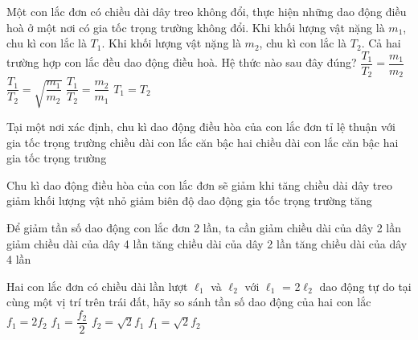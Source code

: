 \begin{ex}
Một con lắc đơn có chiều dài dây treo không đổi, thực hiện những dao động điều hoà ở một nơi có gia tốc trọng trường không đổi. Khi khối lượng vật nặng là $m_1$, chu kì con lắc là $T_1$. Khi khối lượng vật nặng là $m_2$, chu kì con lắc là $T_2$. Cả hai trường hợp con lắc đều dao động điều hoà. Hệ thức nào sau đây đúng?
\choice
{$\dfrac{T_1}{T_2}=\dfrac{m_1}{m_2}$}
{$\dfrac{T_1}{T_2}=\sqrt{\dfrac{m_1}{m_2}}$}
{$\dfrac{T_1}{T_2}=\dfrac{m_2}{m_1}$}
{\True $T_1=T_2$}
\end{ex} 
\begin{ex} %
Tại một nơi xác định, chu kì dao động điều hòa của con lắc đơn tỉ lệ thuận với
\choice
{gia tốc trọng trường}
{chiều dài con lắc}
{\True căn bậc hai chiều dài con lắc}
{căn bậc hai gia tốc trọng trường}
\end{ex} 
\begin{ex} %
Chu kì dao động điều hòa của con lắc đơn sẽ giảm khi
\choice
{tăng chiều dài dây treo}
{giảm khối lượng vật nhỏ}
{giảm biên độ dao động}
{\True gia tốc trọng trường tăng}
\end{ex} 

\begin{ex} %
Để giảm tần số dao động con lắc đơn 2 lần, ta cần
\choice
{giảm chiều dài của dây 2 lần}
{giảm chiều dài của dây 4 lần}
{tăng chiều dài của dây 2 lần}
{\True tăng chiều dài của dây 4 lần}

\end{ex} 

\begin{ex} %
Hai con lắc đơn có chiều dài lần lượt $\ell_1$ và $\ell_2$ với $\ell_1$ = 2$\ell_2$ dao động tự do tại cùng một vị trí trên trái đất, hãy so sánh tần số dao động của hai con lắc
\choice
{$f_1 = 2f_2$}
{$f_1 = \dfrac{f_2}{2}$}
{\True $f_2 = \sqrt{2}f_1$}
{$f_1 = \sqrt{2}f_2$}
\end{ex} 















